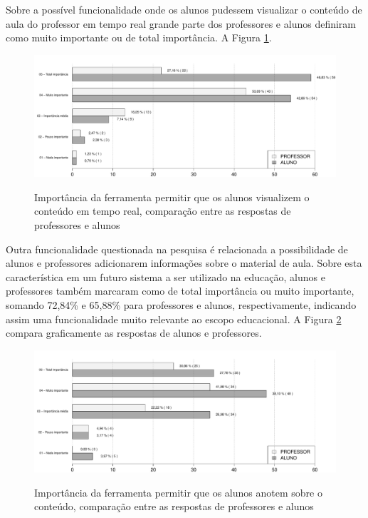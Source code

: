 Sobre a possível funcionalidade onde os alunos pudessem visualizar o conteúdo de aula do professor em tempo real grande parte dos professores e alunos definiram como muito importante ou de total importância. A Figura \ref{fig:grafico_visualizar}.

\begin{figure}
\centering
\caption{Importância da ferramenta permitir que os alunos visualizem o conteúdo em tempo real, comparação entre as respostas de professores e alunos}
\includegraphics[width=1.0\textwidth]{pdfs/alunos-professores/funcionalidades-visualizar-conteudo.pdf} 
\label{fig:grafico_visualizar} 
\end{figure}

Outra funcionalidade questionada na pesquisa é relacionada a possibilidade de alunos e professores adicionarem informações sobre o material de aula. Sobre esta característica em um futuro sistema a ser utilizado na educação, alunos e professores também marcaram como de total importância ou muito importante, somando 72,84\% e 65,88\% para professores e alunos, respectivamente, indicando assim uma funcionalidade muito relevante ao escopo educacional. A Figura \ref{fig:grafico_anotacoes} compara graficamente as respostas de alunos e professores. 

\begin{figure}
\centering
\caption{Importância da ferramenta permitir que os alunos anotem sobre o conteúdo, comparação entre as respostas de professores e alunos}
\includegraphics[width=1.0\textwidth]{pdfs/alunos-professores/funcionalidades-anotacoes.pdf} 
\label{fig:grafico_anotacoes} 
\end{figure}


